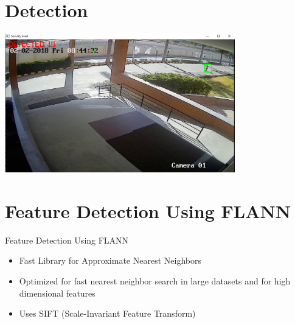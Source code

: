 \documentclass{beamer}
\begin{document}

\section{Detection}
\begin{frame}{}
  \begin{center}
    \includegraphics[width=10cm,keepaspectratio]{personDetection.png}
  \end{center}
\end{frame}


\section{Feature Detection Using FLANN} 
\begin{frame}{Feature Detection Using FLANN}
  \begin{itemize}
   
    \item Fast Library for Approximate Nearest Neighbors
    \newline
    \item Optimized for fast nearest neighbor search in large datasets and for high dimensional features
    \newline
    \item Uses SIFT (Scale-Invariant Feature Transform)
    \newline
 

  \end{itemize}
\end{frame}

\end{document}
